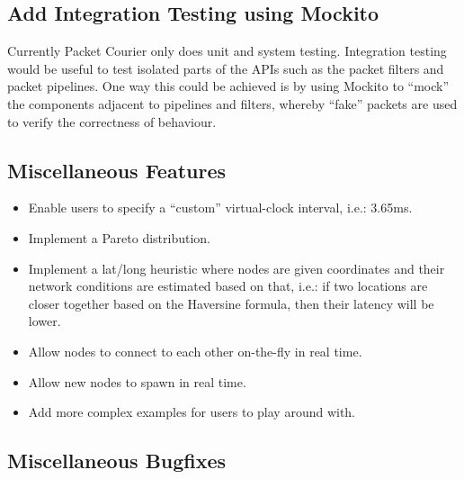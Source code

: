\subsection{Add Integration Testing using Mockito}\label{subsection:add_integration_testing_using_mockito}

Currently Packet Courier only does unit and system testing. Integration testing would be useful to test isolated
parts of the APIs such as the packet filters and packet pipelines. One way this could be achieved is by using
Mockito\cite{mockito} to ``mock'' the components adjacent to pipelines and filters, whereby ``fake'' packets are used
to verify the correctness of behaviour.

\subsection{Miscellaneous Features}\label{subsection:miscellaneous_features}

\begin{itemize}
    \item Enable users to specify a ``custom'' virtual-clock interval, i.e.: 3.65ms.
    \item Implement a Pareto distribution.
    \item Implement a lat/long heuristic where nodes are given coordinates and their network conditions are estimated
    based on that, i.e.: if two locations are closer together based on the Haversine formula\cite{haversine_formula},
    then their latency will be lower.
    \item Allow nodes to connect to each other on-the-fly in real time.
    \item Allow new nodes to spawn in real time.
    \item Add more complex examples for users to play around with.
\end{itemize}

\subsection{Miscellaneous Bugfixes}\label{subsection:miscellaneous_bugfixes}

